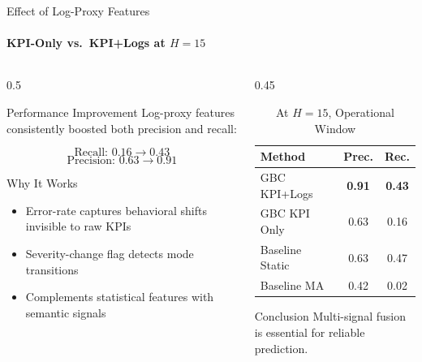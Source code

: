 \documentclass[aspectratio=169,11pt]{beamer}
\begin{document}
\begin{frame}{Effect of Log-Proxy Features}
\framesubtitle{KPI-Only vs.\ KPI+Logs at $H=15$}

\begin{columns}
\begin{column}{0.5\textwidth}
\begin{block}{Performance Improvement}
{\small Log-proxy features consistently boosted both precision and recall:}

\vspace{0.4em}
\[
\text{Recall: } 0.16 \rightarrow 0.43
\]
\[
\text{Precision: } 0.63 \rightarrow 0.91
\]
\end{block}

\vspace{0.4em}
\begin{block}{Why It Works}
{\footnotesize
\begin{itemize}
    \item Error-rate captures behavioral shifts invisible to raw KPIs
    \item Severity-change flag detects mode transitions
    \item Complements statistical features with semantic signals
\end{itemize}
}
\end{block}
\end{column}

\begin{column}{0.45\textwidth}
\begin{table}
\centering
\small
\begin{tabular}{lcc}
\toprule
\textbf{Method} & \textbf{Prec.} & \textbf{Rec.} \\
\midrule
GBC KPI+Logs & \textbf{0.91} & \textbf{0.43} \\
GBC KPI Only & 0.63 & 0.16 \\
Baseline Static & 0.63 & 0.47 \\
Baseline MA & 0.42 & 0.02 \\
\bottomrule
\end{tabular}
\caption{\small At $H=15$, Operational Window}
\end{table}

\vspace{0.3em}
\begin{alertblock}{Conclusion}
{\small Multi-signal fusion is essential for reliable prediction.}
\end{alertblock}
\end{column}
\end{columns}
\end{frame}
\end{document}
